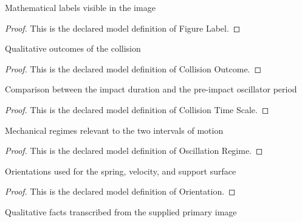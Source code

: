 \begin{definition}
  \label{def:physics:phyx-mini-0261:phyxminiproblems-problemphyxmini0261-figurelabel}
  Mathematical labels visible in the image
\end{definition}
\begin{proof}
  This is the declared model definition of Figure Label.
\end{proof}
\begin{definition}
  \label{def:physics:phyx-mini-0261:phyxminiproblems-problemphyxmini0261-collisionoutcome}
  Qualitative outcomes of the collision
\end{definition}
\begin{proof}
  This is the declared model definition of Collision Outcome.
\end{proof}
\begin{definition}
  \label{def:physics:phyx-mini-0261:phyxminiproblems-problemphyxmini0261-collisiontimescale}
  Comparison between the impact duration and the pre-impact oscillator period
\end{definition}
\begin{proof}
  This is the declared model definition of Collision Time Scale.
\end{proof}
\begin{definition}
  \label{def:physics:phyx-mini-0261:phyxminiproblems-problemphyxmini0261-oscillationregime}
  Mechanical regimes relevant to the two intervals of motion
\end{definition}
\begin{proof}
  This is the declared model definition of Oscillation Regime.
\end{proof}
\begin{definition}[Orientation]
  \label{def:physics:phyx-mini-0261:phyxminiproblems-problemphyxmini0261-orientation}
  Orientations used for the spring, velocity, and support surface
\end{definition}
\begin{proof}
  This is the declared model definition of Orientation.
\end{proof}
\begin{definition}
  \label{def:physics:phyx-mini-0261:phyxminiproblems-problemphyxmini0261-springcollisionfigure}
  Qualitative facts transcribed from the supplied primary image
\end{definition}
